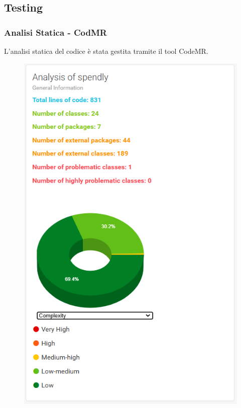 \subsection{Testing}
\subsubsection{Analisi Statica - CodMR}

L'analisi statica del codice è stata gestita tramite il tool CodeMR.

\begin{figure}[H]
    \centering
    \begin{minipage}{0.45\textwidth}
        \centering
        \includegraphics[width=\textwidth]{images/complexity_iter1.png}

\end{minipage}
\end{figure}
